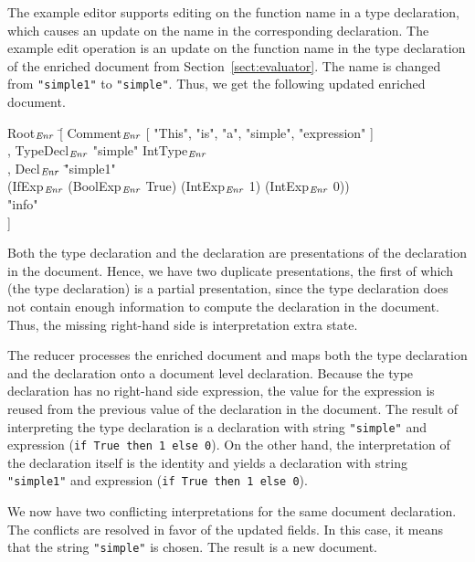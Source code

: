\documentclass{speauth}
\begin{document}
The example editor supports editing on the function name in a type declaration, which causes an update on the name in the corresponding declaration. 
The example edit operation is an update on the function name in the type declaration of the enriched document from Section~\ref{sect:evaluator}. The name is changed from \verb|"simple1"| to \verb|"simple"|. Thus, we get the following updated enriched document.

\small \ttfamily
\begin{tabbing}
Root$_{\mathit{Enr}}$ \= [ Comment$_{\mathit{Enr}}$ [ "This", "is", "a", "simple", "expression" ]\\
       \> , TypeDecl$_{\mathit{Enr}}$ "simple" IntType$_{\mathit{Enr}}$\\
       \> , Decl$_{\mathit{Enr}}$ \= "simple1"\\
       \>                       \> (IfExp$_{\mathit{Enr}}$ (BoolExp$_{\mathit{Enr}}$ True) (IntExp$_{\mathit{Enr}}$ 1) (IntExp$_{\mathit{Enr}}$ 0)) \\
       \>                       \> "info"\\
       \> ] 
\end{tabbing}
\rmfamily \normalsize

Both the type declaration and the declaration are presentations of the declaration in the document. Hence, we have two duplicate presentations, the first of which (the type declaration) is a partial presentation, since the type declaration does not contain enough information to compute the declaration in the document. Thus, the missing right-hand side is interpretation extra state.


The reducer processes the enriched document and maps both the type declaration and the declaration onto a document level declaration. Because the type declaration has no right-hand side expression, the value for the expression is reused from the previous value of the declaration in the document. The result of interpreting the type declaration is a declaration with string 
\verb|"simple"| and expression (\verb|if True then 1 else 0|). On the other hand, the interpretation of  the declaration itself is the identity and yields a declaration with string \verb|"simple1"| and  expression (\verb|if True then 1 else 0|).

We now have two conflicting interpretations for the same document declaration. The conflicts are resolved in favor of the updated fields. In this case, it means that the string \verb|"simple"| is chosen. The result is a new document.
\end{document}
